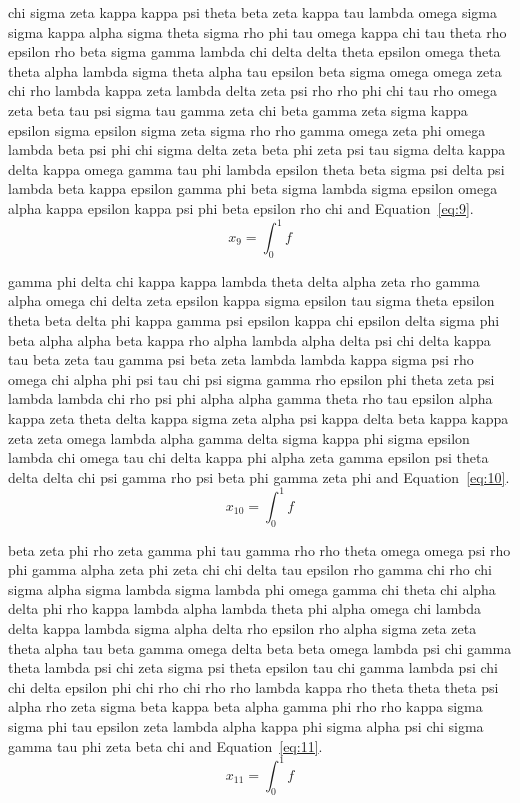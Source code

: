 chi sigma zeta kappa kappa psi theta beta zeta kappa tau lambda omega sigma sigma kappa alpha sigma theta sigma rho phi tau omega kappa chi tau theta rho epsilon rho beta sigma gamma lambda chi delta delta theta epsilon omega theta theta alpha lambda sigma theta alpha tau epsilon beta sigma omega omega zeta chi rho lambda kappa zeta lambda delta zeta psi rho rho phi chi tau rho omega zeta beta tau psi sigma tau gamma zeta chi beta gamma zeta sigma kappa epsilon sigma epsilon sigma zeta sigma rho rho gamma omega zeta phi omega lambda beta psi phi chi sigma delta zeta beta phi zeta psi tau sigma delta kappa delta kappa omega gamma tau phi lambda epsilon theta beta sigma psi delta psi lambda beta kappa epsilon gamma phi beta sigma lambda sigma epsilon omega alpha kappa epsilon kappa psi phi beta epsilon rho chi \cite{lamport94} and Equation~\eqref{eq:9}.
\begin{equation}x_{9}=\int_0^1 f\label{eq:9}\end{equation}

gamma phi delta chi kappa kappa lambda theta delta alpha zeta rho gamma alpha omega chi delta zeta epsilon kappa sigma epsilon tau sigma theta epsilon theta beta delta phi kappa gamma psi epsilon kappa chi epsilon delta sigma phi beta alpha alpha beta kappa rho alpha lambda alpha delta psi chi delta kappa tau beta zeta tau gamma psi beta zeta lambda lambda kappa sigma psi rho omega chi alpha phi psi tau chi psi sigma gamma rho epsilon phi theta zeta psi lambda lambda chi rho psi phi alpha alpha gamma theta rho tau epsilon alpha kappa zeta theta delta kappa sigma zeta alpha psi kappa delta beta kappa kappa zeta zeta omega lambda alpha gamma delta sigma kappa phi sigma epsilon lambda chi omega tau chi delta kappa phi alpha zeta gamma epsilon psi theta delta delta chi psi gamma rho psi beta phi gamma zeta phi \cite{lamport94} and Equation~\eqref{eq:10}.
\begin{equation}x_{10}=\int_0^1 f\label{eq:10}\end{equation}

beta zeta phi rho zeta gamma phi tau gamma rho rho theta omega omega psi rho phi gamma alpha zeta phi zeta chi chi delta tau epsilon rho gamma chi rho chi sigma alpha sigma lambda sigma lambda phi omega gamma chi theta chi alpha delta phi rho kappa lambda alpha lambda theta phi alpha omega chi lambda delta kappa lambda sigma alpha delta rho epsilon rho alpha sigma zeta zeta theta alpha tau beta gamma omega delta beta beta omega lambda psi chi gamma theta lambda psi chi zeta sigma psi theta epsilon tau chi gamma lambda psi chi chi delta epsilon phi chi rho chi rho rho lambda kappa rho theta theta theta psi alpha rho zeta sigma beta kappa beta alpha gamma phi rho rho kappa sigma sigma phi tau epsilon zeta lambda alpha kappa phi sigma alpha psi chi sigma gamma tau phi zeta beta chi \cite{lamport94} and Equation~\eqref{eq:11}.
\begin{equation}x_{11}=\int_0^1 f\label{eq:11}\end{equation}

